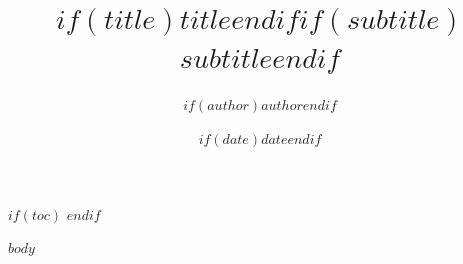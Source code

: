 \documentclass[$if(fontsize)$$fontsize$,$endif$$if(lang)$$babel-lang$,$endif$]{article}
\title{$if(title)$$title$$endif$$if(subtitle)$\\\vspace{0.5em}\large $subtitle$$endif$}
\author{$if(author)$$author$$endif$}
\date{$if(date)$$date$$endif$}
\begin{document}
\maketitle

$if(toc)$
\tableofcontents
\newpage
$endif$

$body$
\end{document}
